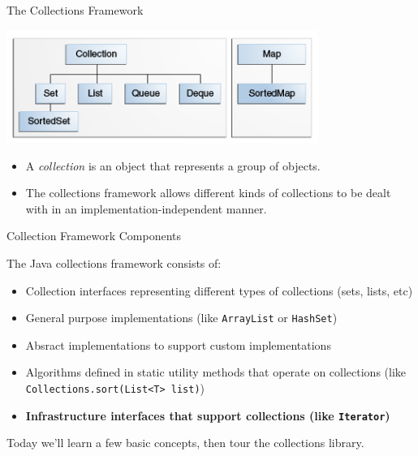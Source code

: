 \documentclass{beamer}
\begin{document}
\begin{frame}
  \titlepage
\end{frame}


\begin{frame}[fragile]{The Collections Framework}

\begin{center}
\includegraphics[width=4in]{colls-coreInterfaces.png}
\end{center}

\begin{itemize}
\item A {\it collection} is an object that represents a group of objects.
\item The collections framework allows different kinds of collections to be dealt with in an implementation-independent manner.
\end{itemize}


\end{frame}

\begin{frame}[fragile]{Collection Framework Components}

The Java collections framework consists of:
\begin{itemize}
\item Collection interfaces representing different types of collections (sets, lists, etc)
\item General purpose implementations (like {\tt ArrayList} or {\tt HashSet})
\item Absract implementations to support custom implementations
\item Algorithms defined in static utility methods that operate on collections (like {\tt Collections.sort(List<T> list)})
\item {\bf Infrastructure interfaces that support collections (like {\tt Iterator})}
\end{itemize}
Today we'll learn a few basic concepts, then tour the collections library.
\end{frame}
\end{document}
